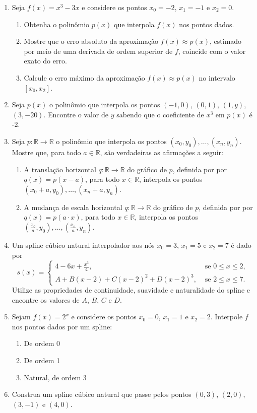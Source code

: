 \documentclass[12pt,a4paper]{article}
\newcommand*\R{\mathbb{R}}
\begin{document}
\begin{enumerate}
\item Seja $f(x) = x^3 - 3x$ e considere os pontos $x_0 = -2$, $x_1 = -1$ e $x_2 = 0$.
\begin{enumerate}
\item Obtenha o polinômio $p(x)$ que interpola $f(x)$ nos pontos dados.
\item Mostre que o erro absoluto da aproximação $f(x) \approx p(x)$, estimado por meio de uma derivada de ordem superior de $f$, coincide com o valor exato do erro.
\item Calcule o erro máximo da aproximação $f(x)\approx p(x)$ no intervalo $[x_0, x_2]$.
\end{enumerate}

\item Seja $p(x)$ o polinômio que interpola os pontos $(-1, 0)$, $(0, 1)$, $(1, y)$, $(3, -20)$. Encontre o valor de $y$ sabendo que o coeficiente de $x^3$ em $p(x)$ é -2.

\item Seja $p:\R \to \R$ o polinômio que interpola os pontos $(x_0, y_0), \ldots, (x_n, y_n)$. Mostre que, para todo $a \in \R$, são verdadeiras as afirmações a seguir:
\begin{enumerate}
\item A translação horizontal $q:\R \to \R$ do gráfico de $p$, definida por por $q(x) = p(x - a)$, para todo $x \in \R$, interpola os pontos $(x_0+a, y_0), \ldots, (x_n+a, y_n)$.
\item A mudança de escala horizontal $q:\R \to \R$ do gráfico de $p$, definida por por $q(x) = p(a \cdot x)$, para todo $x \in \R$, interpola os pontos $(\frac{x_0}{a}, y_0), \ldots, (\frac{x_n}{a}, y_n)$.
\end{enumerate}


\item Um spline cúbico natural interpolador aos nós $x_0 = 3$, $x_1 = 5$ e $x_2 = 7$ é dado por
\[
   s(x) =
   \begin{cases}
      4 - 6x + \frac{x^3}{4}, & \text{ se } 0 \leq x \leq 2,\\
      A + B(x - 2) + C(x - 2)^2 + D(x - 2)^3, & \text{ se } 2 \leq x \leq 7.
   \end{cases}
\]
Utilize as propriedades de continuidade, suavidade e naturalidade do spline e encontre os valores de $A$, $B$, $C$ e $D$.

\item Sejam $f(x) = 2^x$ e considere os pontos $x_0 = 0$, $x_1 = 1$ e $x_2 = 2$. Interpole $f$ nos pontos dados por um spline:
\begin{multicols}{3}
\begin{enumerate}
\item De ordem 0
\item De ordem 1
\item Natural, de ordem 3
\end{enumerate}
\end{multicols}
\item Construa um spline cúbico natural que passe pelos pontos $(0, 3)$, $(2, 0)$, $(3, -1)$ e $(4, 0)$.


\end{enumerate}
\end{document}

